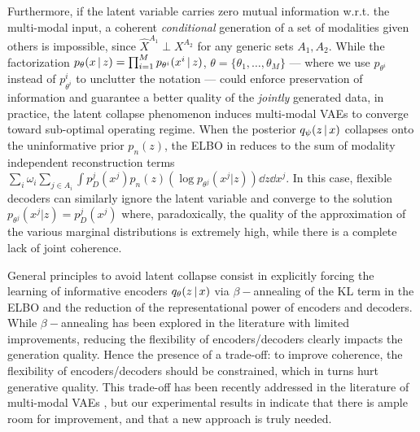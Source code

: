 Furthermore, if the latent variable carries zero mutual information w.r.t. the multi-modal input, a coherent \textit{conditional} generation of a set of modalities given others is impossible, since $\hat{X}^{A_1}\perp X^{A_2}$ for any generic sets $A_1,A_2$. While the factorization $p_\theta(x\,|\, z) = \prod_{i=1}^M p_{\theta^i}(x^i\,|\, z)$, $\theta=\{\theta_1,\dots,\theta_M\}$ --- where we use $p_{\theta^i}$ instead of $p^i_{\theta^i}$ to unclutter the notation --- could enforce preservation of information and guarantee a better quality of the \textit{jointly} generated data, in practice, the latent collapse phenomenon induces multi-modal \glspl{VAE} to converge toward sub-optimal operating regime. When the posterior $q_\psi(z\,|\, x)$ collapses onto the uninformative prior $p_n(z)$, the \gls{ELBO} in  reduces to the sum of modality independent reconstruction terms 
$\sum\limits_i \omega_i \sum_{j\in A_i}\int p_D^{j}(x^{j})p_n(z)\left(\log p_{\theta^j}(x^j|z)\right)\dd z\dd x^{j}$. In this case, flexible decoders can similarly ignore the latent variable and converge to the solution $p_{\theta^j}(x^j|z)=p_D^{j}(x^{j})$ where, paradoxically, the quality of the approximation of the various marginal distributions is extremely high, while there is a complete lack of joint coherence. 

General principles to avoid latent collapse consist in explicitly forcing the learning of informative encoders $q_\theta(z\,|\, x)$ via $\beta-$annealing of the \gls{KL} term in the \gls{ELBO} and the reduction of the representational power of encoders and decoders. While $\beta-$annealing has been explored in the literature \citep{mvaeWu2018} with limited improvements, reducing the flexibility of encoders/decoders clearly impacts the generation quality.
Hence the presence of a trade-off: to improve coherence, the flexibility of encoders/decoders should be constrained, which in turns hurt generative quality. This trade-off has been recently addressed in the literature of multi-modal \glspl{VAE} \citep{Daunhawer2021, palumbo2023mmvae}, but our experimental results in  indicate that there is ample room for improvement, and that a new approach is truly needed.

